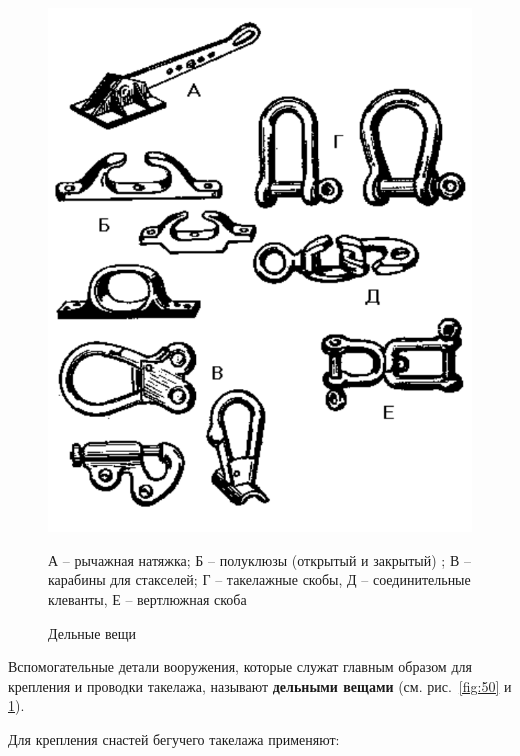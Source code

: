 \documentclass[a4paper, 12pt, twoside, final]{scrbook}
\begin{document}
\begin{figure}[htbp]
\begin{centering}
\includegraphics{pics/Delnye_veschi}
\par\end{centering}

\protect\caption{\label{fig:51}Дельные вещи}

\begin{centering} \small
А \--- рычажная натяжка; Б \--- полуклюзы (открытый и закрытый) ; В \--- карабины
для стакселей; Г \--- такелажные скобы, Д \--- соединительные клеванты,
Е \--- вертлюжная скоба
\par\end{centering}

\end{figure}

Вспомогательные детали вооружения, которые служат главным образом для крепления и проводки такелажа, называют \textbf{дельными вещами} (см. рис.~\ref{fig:50} и \ref{fig:51}).

Для крепления снастей бегучего такелажа применяют:
\end{document}

